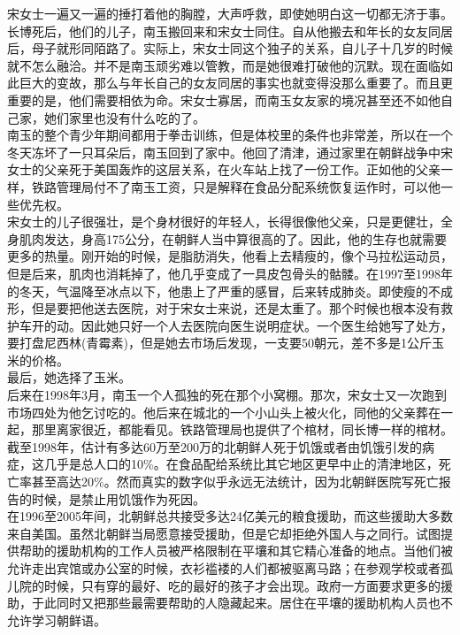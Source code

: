 宋女士一遍又一遍的捶打着他的胸膛，大声呼救，即使她明白这一切都无济于事。\\

长博死后，他们的儿子，南玉搬回来和宋女士同住。自从他搬去和年长的女友同居后，母子就形同陌路了。实际上，宋女士同这个独子的关系，自儿子十几岁的时候就不怎么融洽。并不是南玉顽劣难以管教，而是她很难打破他的沉默。现在面临如此巨大的变故，那么与年长自己的女友同居的事实也就变得没那么重要了。而且更重要的是，他们需要相依为命。宋女士寡居，而南玉女友家的境况甚至还不如他自己家，她们家里也没有什么吃的了。\\

南玉的整个青少年期间都用于拳击训练，但是体校里的条件也非常差，所以在一个冬天冻坏了一只耳朵后，南玉回到了家中。他回了清津，通过家里在朝鲜战争中宋女士的父亲死于美国轰炸的这层关系，在火车站上找了一份工作。正如他的父亲一样，铁路管理局付不了南玉工资，只是解释在食品分配系统恢复运作时，可以他一些优先权。\\

宋女士的儿子很强壮，是个身材很好的年轻人，长得很像他父亲，只是更健壮，全身肌肉发达，身高175公分，在朝鲜人当中算很高的了。因此，他的生存也就需要更多的热量。刚开始的时候，是脂肪消失，他看上去精瘦的，像个马拉松运动员，但是后来，肌肉也消耗掉了，他几乎变成了一具皮包骨头的骷髅。在1997至1998年的冬天，气温降至冰点以下，他患上了严重的感冒，后来转成肺炎。即使瘦的不成形，但是要把他送去医院，对于宋女士来说，还是太重了。那个时候也根本没有救护车开的动。因此她只好一个人去医院向医生说明症状。一个医生给她写了处方，要打盘尼西林(青霉素)，但是她去市场后发现，一支要50朝元，差不多是1公斤玉米的价格。\\

最后，她选择了玉米。\\

后来在1998年3月，南玉一个人孤独的死在那个小窝棚。那次，宋女士又一次跑到市场四处为他乞讨吃的。他后来在城北的一个小山头上被火化，同他的父亲葬在一起，那里离家很近，都能看见。铁路管理局也提供了个棺材，同长博一样的棺材。\\

截至1998年，估计有多达60万至200万的北朝鲜人死于饥饿或者由饥饿引发的病症，这几乎是总人口的10\%。在食品配给系统比其它地区更早中止的清津地区，死亡率甚至高达20\%。然而真实的数字似乎永远无法统计，因为北朝鲜医院写死亡报告的时候，是禁止用饥饿作为死因。\\

在1996至2005年间，北朝鲜总共接受多达24亿美元的粮食援助，而这些援助大多数来自美国。虽然北朝鲜当局愿意接受援助，但是它却拒绝外国人与之同行。试图提供帮助的援助机构的工作人员被严格限制在平壤和其它精心准备的地点。当他们被允许走出宾馆或办公室的时候，衣衫褴褛的人们都被驱离马路；在参观学校或者孤儿院的时候，只有穿的最好、吃的最好的孩子才会出现。政府一方面要求更多的援助，于此同时又把那些最需要帮助的人隐藏起来。居住在平壤的援助机构人员也不允许学习朝鲜语。\\

